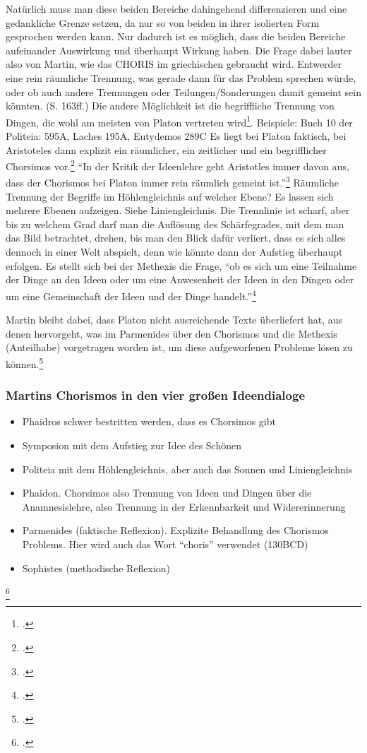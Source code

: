 \documentclass[12pt]{article}
\begin{document}
Natürlich muss man diese beiden Bereiche dahingehend differenzieren und eine gedankliche Grenze setzen, da nur so von beiden in ihrer isolierten Form gesprochen werden kann. Nur dadurch ist es möglich, dass die beiden Bereiche aufeinander Auswirkung und überhaupt Wirkung haben.
Die Frage dabei lauter also von Martin, wie das CHORIS im griechischen gebraucht wird. Entwerder eine rein räumliche Trennung, was gerade dann für das Problem sprechen würde, oder ob auch andere Trennungen oder Teilungen/Sonderungen damit gemeint sein könnten. (S. 163ff.)
Die andere Möglichkeit ist die begriffliche Trennung von Dingen, die wohl am meisten von Platon vertreten wird\footcite[vgl.][S. 165]{Martin73}. Beispiele: Buch 10 der Politeia: 595A, Laches 195A, Eutydemos 289C
Es liegt bei Platon faktisch, bei Aristoteles dann explizit ein räumlicher, ein zeitlicher und ein begrifflicher Chorsimos vor.\footcite[vgl.][S. 166]{Martin73}
\enquote{In der Kritik der Ideenlehre geht Aristotles immer davon aus, dass der Chorismos bei Platon immer rein räumlich gemeint ist.}\footcite[][S. 166]{Martin73}
Räumliche Trennung der Begriffe im Höhlengleichnis auf welcher Ebene? Es lassen sich mehrere Ebenen aufzeigen. Siehe Liniengleichnis. Die Trennlinie ist scharf, aber bis zu welchem Grad darf man die Auflösung des Schärfegrades, mit dem man das Bild betrachtet, drehen, bis man den Blick dafür verliert, dass es sich alles dennoch in einer Welt abspielt, denn wie könnte dann der Aufstieg überhaupt erfolgen.
Es stellt sich bei der Methexis die Frage, \enquote{ob es sich um eine Teilnahme der Dinge an den Ideen oder um eine Anwesenheit der Ideen in den Dingen oder um eine Gemeinschaft der Ideen und der Dinge handelt.}\footcite[vgl.][S. 170]{Martin73}

Martin bleibt dabei, dass Platon nicht ausreichende Texte überliefert hat, aus denen hervorgeht, was im Parmenides über den Chorismos und die Methexis (Anteilhabe) vorgetragen worden ist, um diese aufgeworfenen Probleme lösen zu können.\footcite[vgl.][S. 173f.]{Martin73}
\subsubsection*{Martins Chorismos in den vier großen Ideendialoge}

\begin{itemize}
    \item {Phaidros schwer bestritten werden, dass es Chorsimos gibt}
    \item {Symposion mit dem Aufstieg zur Idee des Schönen}
    \item {Politeia mit dem Höhlengleichnis, aber auch das Sonnen und Liniengleichnis}
    \item {Phaidon. Chorsimos also Trennung von Ideen und Dingen über die Anamnesislehre, also Trennung in der Erkennbarkeit und Widererinnerung}
    \item {Parmenides (faktische Reflexion). Explizite Behandlung des Chorismos Problems. Hier wird auch das Wort \enquote{choris} verwendet (130BCD)}
    \item {Sophistes (methodische Reflexion)}
\end{itemize}
\footcite[vgl.][S. 160]{Martin73}
\end{document}
